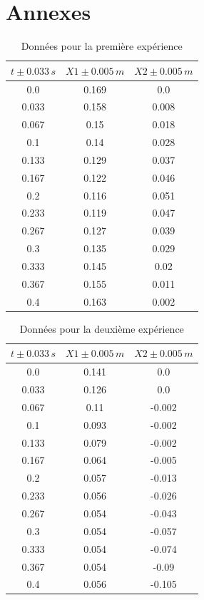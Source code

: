 \documentclass[12pt]{article}
\begin{document}
\section*{Annexes}
\begin{table}[h!]
	\begin{center}
		\begin{tabular}{|c|c|c|}
		\hline
		$t\pm 0.033\, s$ & $X1\pm 0.005\, m$ & $X2\pm 0.005\, m$\\
		\hline
		0.0 & 0.169 & 0.0 \\ 
0.033 & 0.158 & 0.008 \\ 
0.067 & 0.15 & 0.018 \\ 
0.1 & 0.14 & 0.028 \\ 
0.133 & 0.129 & 0.037 \\ 
0.167 & 0.122 & 0.046 \\ 
0.2 & 0.116 & 0.051 \\ 
0.233 & 0.119 & 0.047 \\ 
0.267 & 0.127 & 0.039 \\ 
0.3 & 0.135 & 0.029 \\ 
0.333 & 0.145 & 0.02 \\ 
0.367 & 0.155 & 0.011 \\ 
0.4 & 0.163 & 0.002 \\ 	
\hline	
		\end{tabular}
		\label{Données1}
		\caption{Données pour la première expérience}
	\end{center}
\end{table}

\begin{table}[h!]
	\begin{center}
		\begin{tabular}{|c|c|c|}
		\hline
		$t\pm 0.033\, s$ & $X1\pm 0.005\, m$ & $X2\pm 0.005\, m$\\
		\hline
		0.0 & 0.141 & 0.0 \\ 
0.033 & 0.126 & 0.0 \\ 
0.067 & 0.11 & -0.002 \\ 
0.1 & 0.093 & -0.002 \\ 
0.133 & 0.079 & -0.002 \\ 
0.167 & 0.064 & -0.005 \\ 
0.2 & 0.057 & -0.013 \\ 
0.233 & 0.056 & -0.026 \\ 
0.267 & 0.054 & -0.043 \\ 
0.3 & 0.054 & -0.057 \\ 
0.333 & 0.054 & -0.074 \\ 
0.367 & 0.054 & -0.09 \\ 
0.4 & 0.056 & -0.105 \\ 	
\hline
		\end{tabular}
		\label{Données2}
		\caption{Données pour la deuxième expérience}
	\end{center}
\end{table}
\end{document}
